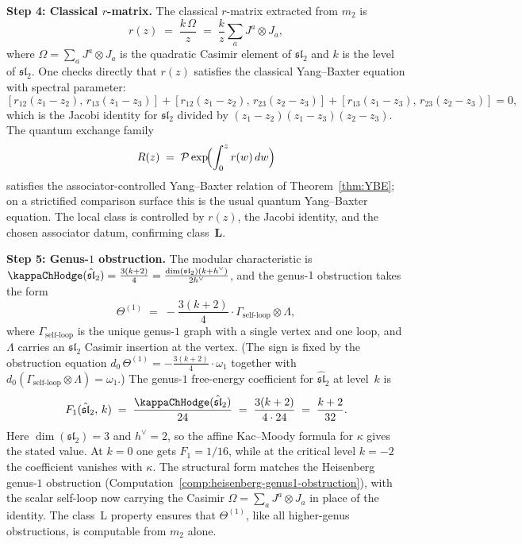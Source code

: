 \begin{computation}
\medskip
\noindent\textbf{Step 4: Classical $r$-matrix.}
The classical $r$-matrix extracted from $m_2$ is
\begin{equation}\label{eq:sl2-r-matrix}
r(z) \;=\; \frac{k\,\Omega}{z}
\;=\; \frac{k}{z}\sum_{a} J^a \otimes J_a,
\end{equation}
where $\Omega = \sum_a J^a\otimes J_a$ is the quadratic
Casimir element of $\mathfrak{sl}_2$ and $k$ is the level
of $\widehat{\mathfrak{sl}}_2$. One checks directly
that $r(z)$ satisfies the classical Yang--Baxter equation
with spectral parameter:
\[
[r_{12}(z_1{-}z_2),\, r_{13}(z_1{-}z_3)]
+ [r_{12}(z_1{-}z_2),\, r_{23}(z_2{-}z_3)]
+ [r_{13}(z_1{-}z_3),\, r_{23}(z_2{-}z_3)]
= 0,
\]
which is the Jacobi identity for $\mathfrak{sl}_2$ divided
by $(z_1{-}z_2)(z_1{-}z_3)(z_2{-}z_3)$. The quantum exchange family
\begin{equation}\label{eq:sl2-R-matrix}
R(z) \;=\; \mathcal{P}\exp\!\Bigl(\int_0^z
r(w)\,dw\Bigr)
\end{equation}
satisfies the associator-controlled Yang--Baxter relation of
Theorem~\ref{thm:YBE}; on a strictified comparison surface this is the
usual quantum Yang--Baxter equation. The local class is controlled by
$r(z)$, the Jacobi identity, and the chosen associator datum,
confirming class~$\mathbf L$.

\medskip
\noindent\textbf{Step 5: Genus-$1$ obstruction.}
The modular characteristic is $\kappaChHodge(\hat{\mathfrak{sl}}_2)
= \frac{3(k+2)}{4}
= \frac{\dim(\mathfrak{sl}_2)(k+h^\vee)}{2h^\vee}$, and the genus-$1$ obstruction takes the form
\begin{equation}\label{eq:sl2-genus1}
\Theta^{(1)} \;=\;
-\frac{3(k+2)}{4} \cdot \Gamma_{\text{self-loop}} \otimes \Lambda,
\end{equation}
where $\Gamma_{\text{self-loop}}$ is the unique genus-$1$
graph with a single vertex and one loop, and $\Lambda$
carries an $\mathfrak{sl}_2$ Casimir insertion at the
vertex. (The sign is fixed by the obstruction equation
$d_0\,\Theta^{(1)} = -\frac{3(k+2)}{4}\cdot\omega_1$ together with
$d_0(\Gamma_{\text{self-loop}} \otimes \Lambda) = \omega_1$.)
The genus-$1$ free-energy coefficient for
$\hat{\mathfrak{sl}}_2$ at level~$k$ is
\[
F_1(\hat{\mathfrak{sl}}_2,\, k)
\;=\;
\frac{\kappaChHodge(\hat{\mathfrak{sl}}_2)}{24}
\;=\;
\frac{3(k+2)}{4\cdot 24}
\;=\;
\frac{k+2}{32}.
\]
Here $\dim(\mathfrak{sl}_2)=3$ and $h^\vee=2$, so the affine
Kac--Moody formula for $\kappa$ gives the stated value. At
$k=0$ one gets $F_1 = 1/16$, while at the critical level
$k=-2$ the coefficient vanishes with $\kappa$. The structural form matches the
Heisenberg genus-$1$ obstruction
(Computation~\ref{comp:heisenberg-genus1-obstruction}),
with the scalar self-loop now carrying the Casimir
$\Omega = \sum_a J^a \otimes J_a$ in place of the identity.
The class~L property ensures that
$\Theta^{(1)}$, like all higher-genus
obstructions, is computable from $m_2$ alone.
\end{computation}

